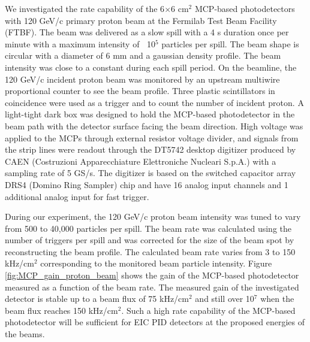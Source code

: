 \documentclass[preprint,5p]{elsarticle}
\begin{document}
We investigated the rate capability of the 6$\times$6 cm$^2$ MCP-based 
photodetectors with 120 GeV/c primary proton beam at the Fermilab Test Beam 
Facility (FTBF). The beam was delivered as a slow spill with a 4 s duration 
once per minute with a maximum intensity of $~$ 10$^5$ particles per spill.  
The beam shape is circular with a diameter of 6 mm and a gaussian density 
profile. The beam intensity was close to a constant during each spill period.  
On the beamline, the 120 GeV/c incident proton beam was monitored by an 
upstream multiwire proportional counter to see the beam profile. Three plastic 
scintillators in coincidence were used as a trigger and to count the number of 
incident proton. A light-tight dark box was designed to hold the MCP-based 
photodetector in the beam path with the detector surface facing the beam 
direction. High voltage was applied to the MCPs through external resistor 
voltage divider, and signals from the strip lines were readout through the 
DT5742 desktop digitizer \cite{Digitizer} produced by CAEN (Costruzioni 
Apparecchiature Elettroniche Nucleari S.p.A.) with a sampling rate of 5 GS/s.  
The digitizer is based on the switched capacitor array DRS4 (Domino Ring 
Sampler) chip \cite{DRS} and have 16 analog input channels and 1 additional 
analog input for fast trigger.

During our experiment, the 120 GeV/c proton beam intensity was tuned to vary 
from 500 to 40,000 particles per spill. The beam rate was calculated using the 
number of triggers per spill and was corrected for the size of the beam spot by 
reconstructing the beam profile. The calculated beam rate varies from 3 to 150 
kHz/cm$^2$ corresponding to the monitored beam particle intensity. Figure 
\ref{fig:MCP_gain_proton_beam} shows the gain of the MCP-based photodetector 
measured as a function of the beam rate. The measured gain of the investigated 
detector is stable up to a beam flux of 75 kHz/cm$^2$ and still over 10$^7$ 
when the beam flux reaches 150 kHz/cm$^2$. Such a high rate capability of the 
MCP-based photodetector will be sufficient for EIC PID detectors at the 
proposed energies of the beams.
\end{document}
